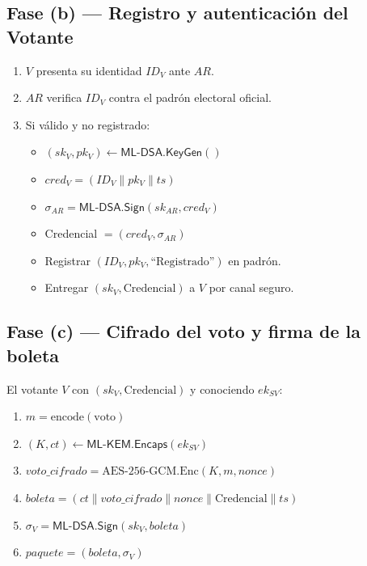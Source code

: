 \documentclass[12pt,a4paper,twoside,openright]{book}
\theoremstyle{plain}
\theoremstyle{definition}
\theoremstyle{remark}
\newcommand{\MLKEM}{\textsf{ML-KEM}}
\newcommand{\MLDSA}{\textsf{ML-DSA}}
\newcommand{\KeyGen}{\mathsf{KeyGen}}
\newcommand{\Encaps}{\mathsf{Encaps}}
\newcommand{\Sign}{\mathsf{Sign}}
\begin{document}
\subsection{Fase (b) --- Registro y autenticaci\'on del Votante}

\begin{enumerate}
  \item $V$ presenta su identidad $ID_V$ ante $AR$.
  \item $AR$ verifica $ID_V$ contra el padr\'on electoral oficial.
  \item Si v\'alido y no registrado:
    \begin{itemize}
      \item $(sk_V, pk_V) \leftarrow \MLDSA.\KeyGen()$
      \item $\mathit{cred}_V = (ID_V \| pk_V \| ts)$
      \item $\sigma_{AR} = \MLDSA.\Sign(sk_{AR}, \mathit{cred}_V)$
      \item Credencial $= (\mathit{cred}_V, \sigma_{AR})$
      \item Registrar $(ID_V, pk_V,\text{``Registrado''})$ en padr\'on.
      \item Entregar $(sk_V, \text{Credencial})$ a $V$ por canal seguro.
    \end{itemize}
\end{enumerate}

\subsection{Fase (c) --- Cifrado del voto y firma de la boleta}

El votante $V$ con $(sk_V, \text{Credencial})$ y conociendo $ek_{SV}$:

\begin{enumerate}
  \item $m = \mathrm{encode}(\text{voto})$
  \item $(K, ct) \leftarrow \MLKEM.\Encaps(ek_{SV})$
  \item $\mathit{voto\_cifrado} = \mathrm{AES\text{-}256\text{-}GCM.Enc}(K, m, \mathit{nonce})$
  \item $\mathit{boleta} = (ct \| \mathit{voto\_cifrado} \| \mathit{nonce}
    \| \text{Credencial} \| ts)$
  \item $\sigma_V = \MLDSA.\Sign(sk_V, \mathit{boleta})$
  \item $\mathit{paquete} = (\mathit{boleta}, \sigma_V)$
\end{enumerate}
\end{document}
